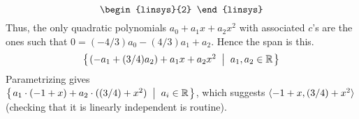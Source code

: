 \begin{Answer}
\begin{equation*}
\begin{linsys}{2}
              \end{linsys}
           \end{equation*}
           Thus, the only quadratic polynomials $a_0+a_1x+a_2x^2$ with 
           associated $c$'s are the ones such that 
           $0=(-4/3)a_0-(4/3)a_1+a_2$.
           Hence the span is this.
           \begin{equation*}
             \mbox{$\left\{\hspace{0.1em}(-a_1+(3/4)a_2)+a_1x+a_2x^2\;\;\middle|\;\; a_1,a_2\in\mathbb{R}\hspace{0.1em}\right\}$}
           \end{equation*}
           Parametrizing gives\\
           $\mbox{$\left\{\hspace{0.1em}a_1\cdot (-1+x)+a_2\cdot ((3/4)+x^2)\;\;\middle|\;\; a_i\in\mathbb{R}\hspace{0.1em}\right\}$}$,
           which suggests $\langle-1+x,(3/4)+x^2\rangle$
           (checking that it is linearly independent is routine).

\end{Answer}
